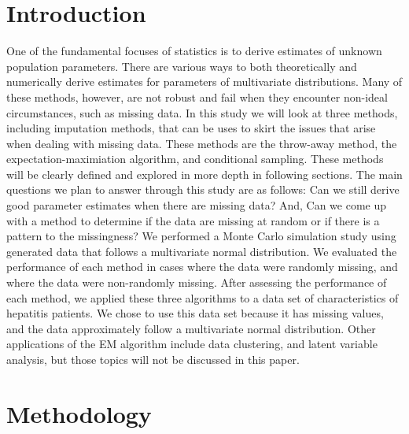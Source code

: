 \documentclass{svproc}
\begin{document}
\section{Introduction}
%
One of the fundamental focuses of statistics is to derive estimates of unknown population parameters. There are various ways to both theoretically and numerically derive estimates for parameters of multivariate distributions. Many of these methods, however, are not robust and fail when they encounter non-ideal circumstances, such as missing data. In this study we will look at three methods, including imputation methods, that can be uses to skirt the issues that arise when dealing with missing data. These methods are the throw-away method, the expectation-maximiation algorithm, and conditional sampling. These methods will be clearly defined and explored in more depth in following sections. The main questions we plan to answer through this study are as follows: Can we still derive good parameter estimates when there are missing data? And, Can we come up with a method to determine if the data are missing at random or if there is a pattern to the missingness? We performed a Monte Carlo simulation study using generated data that follows a multivariate normal distribution. We evaluated the performance of each method in cases where the data were randomly missing, and where the data were non-randomly missing. After assessing the performance of each method, we applied these three algorithms to a data set of characteristics of hepatitis patients. We chose to use this data set because it has missing values, and the data approximately follow a multivariate normal distribution. Other applications of the EM algorithm include data clustering, and latent variable analysis, but those topics will not be discussed in this paper.


\section{Methodology}
%
\end{document}
